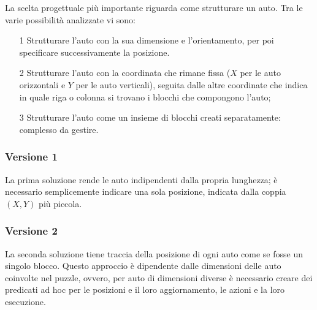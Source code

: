 \documentclass[10pt, a4paper, oneside]{article}
\begin{document}
\noindent %
La scelta progettuale più importante riguarda come strutturare un auto. Tra le varie possibilità analizzate vi sono:
\begin{itemize}
	\item[1] Strutturare l'auto con la sua dimensione e l'orientamento, per poi specificare successivamente la posizione.
	\item[2] Strutturare l'auto con la coordinata che rimane fissa ($X$ per le auto orizzontali e $Y$ per le auto verticali), seguita dalle altre coordinate che indica in quale riga o colonna si trovano i blocchi che compongono l'auto;
	\item[3] Strutturare l'auto come un insieme di blocchi creati separatamente: complesso da gestire.%
\end{itemize}

\subsubsection{Versione 1}
La prima soluzione rende le auto indipendenti dalla propria lunghezza; è necessario semplicemente indicare una sola posizione, indicata dalla coppia $(X,Y)$ più piccola.



\subsubsection{Versione 2}
La seconda soluzione tiene traccia della posizione di ogni auto come se fosse un singolo blocco. Questo approccio è dipendente dalle dimensioni delle auto coinvolte nel puzzle, ovvero, per auto di dimensioni diverse è necessario creare dei predicati ad hoc per le posizioni e il loro aggiornamento, le azioni e la loro esecuzione.
\end{document}
